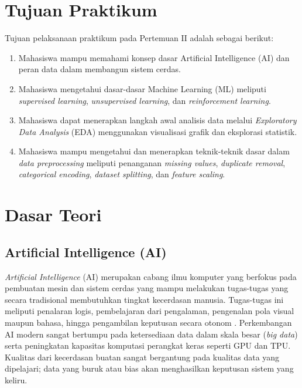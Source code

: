 \documentclass[a4paper,oneside,12pt]{report}
\begin{document}
\setcounter{page}{3}

\chapter[Tujuan Praktikum]{Tujuan Praktikum}
Tujuan pelaksanaan praktikum pada Pertemuan II adalah sebagai berikut:
\begin{enumerate}
    \item Mahasiswa mampu memahami konsep dasar Artificial Intelligence (AI) dan peran data dalam membangun sistem cerdas.
    \item Mahasiswa mengetahui dasar-dasar Machine Learning (ML) meliputi \textit{supervised learning}, \textit{unsupervised learning}, dan \textit{reinforcement learning}.
    \item Mahasiswa dapat menerapkan langkah awal analisis data melalui \textit{Exploratory Data Analysis} (EDA) menggunakan visualisasi grafik dan eksplorasi statistik.
    \item Mahasiswa mampu mengetahui dan menerapkan teknik-teknik dasar dalam \textit{data preprocessing} meliputi penanganan \textit{missing values}, \textit{duplicate removal}, \textit{categorical encoding}, \textit{dataset splitting}, dan \textit{feature scaling}.
\end{enumerate}
\clearpage

\chapter{Dasar Teori}

\section{Artificial Intelligence (AI)}
\textit{Artificial Intelligence} (AI) merupakan cabang ilmu komputer yang berfokus pada pembuatan mesin dan sistem cerdas yang mampu melakukan tugas-tugas yang secara tradisional membutuhkan tingkat kecerdasan manusia. Tugas-tugas ini meliputi penalaran logis, pembelajaran dari pengalaman, pengenalan pola visual maupun bahasa, hingga pengambilan keputusan secara otonom \cite{ref1}. Perkembangan AI modern sangat bertumpu pada ketersediaan data dalam skala besar (\textit{big data}) serta peningkatan kapasitas komputasi perangkat keras seperti GPU dan TPU. Kualitas dari kecerdasan buatan sangat bergantung pada kualitas data yang dipelajari; data yang buruk atau bias akan menghasilkan keputusan sistem yang keliru.
\end{document}

